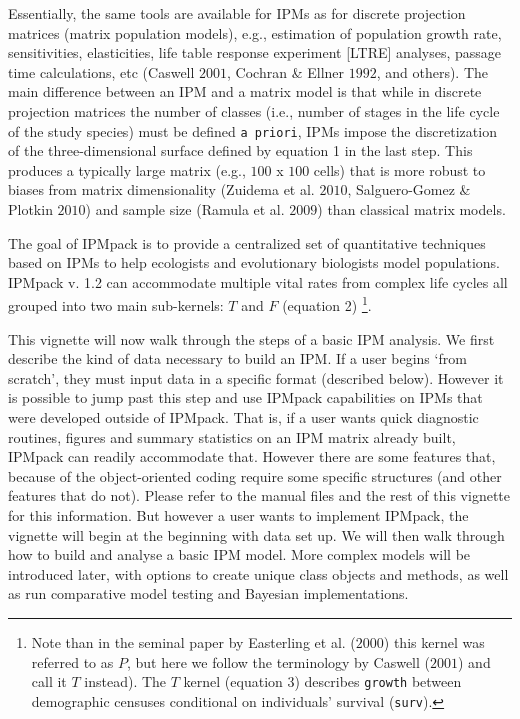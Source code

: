\documentclass{article}
\begin{document}
Essentially, the same tools are available for IPMs as for discrete projection matrices (matrix population models), e.g., estimation of population growth rate, sensitivities, elasticities, life table response experiment [LTRE] analyses, passage time calculations, etc (Caswell $2001$, Cochran \& Ellner $1992$, and others). The main difference between an IPM and a matrix model is that while in discrete projection matrices the number of classes (i.e., number of stages in the life cycle of the study species) must be defined {\tt a priori}, IPMs impose the discretization of the three-dimensional surface defined by equation 1 in the last step. This produces a typically large matrix (e.g., $100$ x $100$ cells) that is more robust to biases from matrix dimensionality (Zuidema et al. $2010$, Salguero-Gomez \& Plotkin $2010$) and sample size (Ramula et al. $2009$) than classical matrix models.  

The goal of IPMpack is to provide a centralized set of quantitative techniques
based on IPMs to help ecologists and evolutionary biologists model populations.
IPMpack v. 1.2 can accommodate multiple vital rates from complex life cycles all
grouped into two main sub-kernels: $T$ and $F$ (equation 2) \footnote{Note than in the seminal paper by Easterling et al. ($2000$) this kernel was referred to as $P$, but here we follow the terminology by Caswell ($2001$) and call it $T$ instead). The $T$ kernel (equation 3) describes {\tt growth} between demographic censuses conditional on individuals' survival ({\tt surv}).
}.

This vignette will now walk through the steps of a basic IPM analysis.  We first describe the kind of data necessary to build an IPM.  If a user begins `from scratch', they must input data in a specific format (described below).  However it is possible to jump past this step and use IPMpack capabilities on IPMs that were developed outside of IPMpack.  That is, if a user wants quick diagnostic routines, figures and summary statistics on an IPM matrix already built, IPMpack can readily accommodate that.   However there are some features that, because of the object-oriented coding require some specific structures (and other features that do not).  Please refer to the manual files and the rest of this vignette for this information.  But however a user wants to implement IPMpack, the vignette will begin at the beginning with data set up.  We will then walk through how to build and analyse a basic IPM model.  More complex models will be introduced later, with options to create unique class objects and methods, as well as run comparative model testing and Bayesian implementations.
\end{document}
